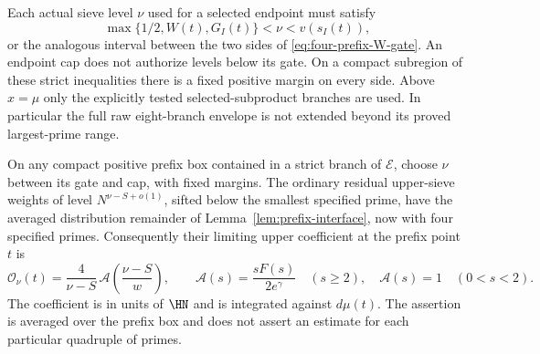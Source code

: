 Each actual sieve level $\nu$ used for a selected endpoint must
satisfy
\[
 \max\{1/2,W(t),G_I(t)\}<\nu<v(s_I(t)),
\]
or the analogous interval between the two sides of
\eqref{eq:four-prefix-W-gate}.  An endpoint cap does not authorize
levels below its gate.  On a compact subregion of these strict
inequalities there is a fixed positive margin on every side.
Above $x=\mu$ only the explicitly tested selected-subproduct branches
are used.  In particular the full raw eight-branch envelope is not
extended beyond its proved largest-prime range.

\begin{lemma}
\label{lem:four-prefix-upper-interface}
On any compact positive prefix box contained in a strict branch of
$\mathcal E$, choose $\nu$ between its gate and cap, with fixed
margins.  The ordinary residual upper-sieve weights of level
$N^{\nu-S+o(1)}$, sifted below the smallest specified prime, have
the averaged distribution remainder of
Lemma~\ref{lem:prefix-interface}, now with four specified primes.
Consequently their limiting upper coefficient at the prefix point
$t$ is
\begin{equation}\label{eq:four-prefix-ordinary-kernel}
 \mathcal O_\nu(t)
 =\frac4{\nu-S}\,
       \mathcal A\left(\frac{\nu-S}{w}\right),
 \qquad
 \mathcal A(s)=\frac{sF(s)}{2e^\gamma}\quad(s\ge2),
 \quad \mathcal A(s)=1\quad(0<s<2).
\end{equation}
The coefficient is in units of $\HN$ and is integrated against
$d\mu(t)$.  The assertion is averaged over the prefix box and does
not assert an estimate for each particular quadruple of primes.
\end{lemma}

